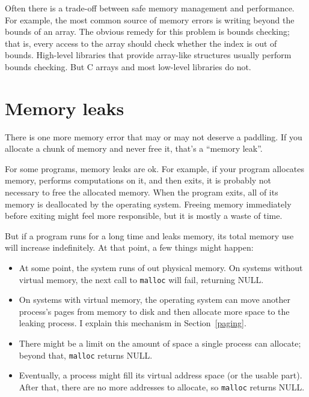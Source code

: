 \documentclass[12pt]{book}
\begin{document}
Often there is a trade-off between safe memory management and performance.
For example, the most common source of memory errors is writing 
beyond the bounds of an array.  The obvious remedy for this problem
is bounds checking; that is, every access to the array should check
whether the index is out of bounds.  High-level libraries that provide
array-like structures usually perform bounds checking.  But C arrays
and most low-level libraries do not.


\section{Memory leaks}
\label{leak}

There is one more memory error that may or may not deserve a paddling.
If you allocate a chunk of memory and never free it, that's a ``memory
leak''.

For some programs, memory leaks are ok.  For example, if your program
allocates memory, performs computations on it, and then exits, it is
probably not necessary to free the allocated memory.  When the program
exits, all of its memory is deallocated by the operating system.
Freeing memory immediately before exiting might feel more responsible,
but it is mostly a waste of time.

But if a program runs for a long time and leaks memory, its total
memory use will increase indefinitely.  At that point, a few things
might happen:

\begin{itemize}

\item At some point, the system runs of out physical memory.  On
  systems without virtual memory, the next call to {\tt malloc} will
  fail, returning NULL.

\item On systems with virtual memory, the operating system can move
  another process's pages from memory to disk and then allocate
  more space to the leaking process.  I explain this mechanism
  in Section~\ref{paging}.

\item There might be a limit on the amount of space a single
  process can allocate; beyond that, {\tt malloc} returns NULL.

\item Eventually, a process might fill its virtual address space (or
  the usable part).  After that, there are no more addresses to
  allocate, so {\tt malloc} returns NULL.

\end{itemize}
\end{document}

